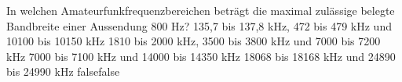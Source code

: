     {In welchen Amateurfunkfrequenzbereichen beträgt die maximal zulässige belegte Bandbreite einer Aussendung 800 Hz?}
    {135,7 bis 137,8 kHz, 472 bis 479 kHz und 10100 bis 10150 kHz}
    {1810 bis 2000 kHz, 3500 bis 3800 kHz und 7000 bis 7200 kHz}
    {7000 bis 7100 kHz und 14000 bis 14350 kHz}
    {18068 bis 18168 kHz und 24890 bis 24990 kHz}
    {false}{false}